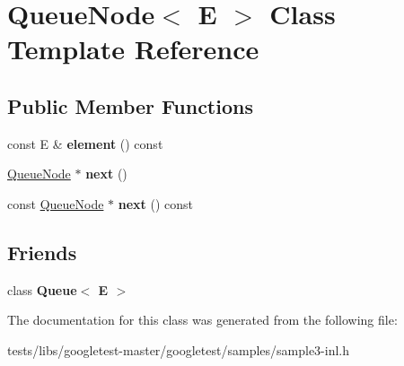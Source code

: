 \hypertarget{classQueueNode}{}\section{Queue\+Node$<$ E $>$ Class Template Reference}
\label{classQueueNode}
\subsection*{Public Member Functions}
\begin{DoxyCompactItemize}
\item 
\mbox{\label{classQueueNode_a1c61b3ed32e089f5901b87022ef84985}} 
const E \& {\bfseries element} () const
\item 
\mbox{\label{classQueueNode_a8a9fdf488da06533360999ef85db56ea}} 
\hyperlink{classQueueNode}{Queue\+Node} $\ast$ {\bfseries next} ()
\item 
\mbox{\label{classQueueNode_ada477e4f309f29383112dbda473dd985}} 
const \hyperlink{classQueueNode}{Queue\+Node} $\ast$ {\bfseries next} () const
\end{DoxyCompactItemize}
\subsection*{Friends}
\begin{DoxyCompactItemize}
\item 
\mbox{\label{classQueueNode_ad4336229b1d7c3626e4ba69f236b202d}} 
class {\bfseries Queue$<$ E $>$}
\end{DoxyCompactItemize}


The documentation for this class was generated from the following file\+:\begin{DoxyCompactItemize}
\item 
tests/libs/googletest-\/master/googletest/samples/sample3-\/inl.\+h\end{DoxyCompactItemize}

